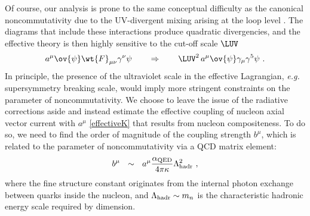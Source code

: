 \documentclass[prl,tightenlines]{revtex4}
\begin{document}
Of course, our analysis is prone to the same conceptual difficulty as the canonical noncommutativity 
due to the UV-divergent mixing arising  at the loop level \cite{Bolokhov:2007yc}. The diagrams that include these interactions 
produce quadratic divergencies, and the effective theory is then highly sensitive to the cut-off scale $ \LUV $
\begin{eqnarray}
	a^\mu \ov{\psi} \wt{F}_{\mu\nu}\gamma^\nu \psi  \qquad \Rightarrow \qquad \LUV^2\, a^\mu \ov{\psi} \gamma_\mu \gamma^5 \psi~.
\end{eqnarray}
In principle, the presence of the ultraviolet scale in the effective Lagrangian, {\em e.g.} supersymmetry breaking scale,
would imply more stringent constraints on the parameter of noncommutativity. 
We choose %
to leave the issue of the radiative corrections aside and instead 
estimate the effective coupling of nucleon axial vector current with $a^\mu$ \eqref{effectiveK} that results from
nucleon compositeness. 
To do so, we need to find the order of magnitude of the coupling strength $ b^\mu $,
which is related to the parameter of noncommutativity via a QCD matrix element:
\begin{equation}
	b^\mu ~~\sim~~ a^\mu \frac{\alpha_{\rm QED}}{4\pi\kappa} \Lambda_{\rm hadr}^2~,
\end{equation}
where the fine structure constant originates from the internal photon exchange between quarks inside the nucleon, and 
$\Lambda_{\rm hadr} \sim m_n$ is the characteristic hadronic energy scale required by dimension. 
\end{document}
